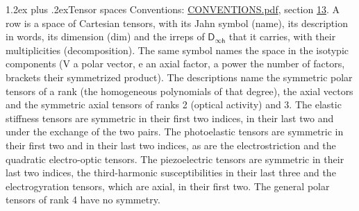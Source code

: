 \documentclass[10pt,a4paper]{article}
\makeatletter
\renewcommand\section{\@startsection{section}{1}{\z@}{-3ex plus -1ex minus -.2ex}%
  {1.2ex plus .2ex}{\normalfont\large\sffamily\bfseries\color{parttitle}}}
\numberwithin{equation}{section}
\newcommand{\grp}[1]{\mathsf{#1}}
\makeatother
\begin{document}
\section{Tensor spaces}\label{s:tensor_spaces}
Conventions: \href{../../CONVENTIONS.pdf}{CONVENTIONS.pdf}, section \href{../../CONVENTIONS.pdf\#conv.13}{13}.
\leavevmode\label{n:head.name}\label{n:head.description}\label{n:head.dim}\label{n:head.decomposition}A row is a space of Cartesian tensors, with its Jahn symbol (name), its description in words, its dimension (dim) and the irreps of $\grp{D_{\infty h}}$ that it carries, with their multiplicities (decomposition). \label{n:label.jahn}The same symbol names the space in the isotypic components (V a polar vector, e an axial factor, a power the number of factors, brackets their symmetrized product). The descriptions name the symmetric polar tensors of a rank (the homogeneous polynomials of that degree), the axial vectors and the symmetric axial tensors of ranks 2 (optical activity) and 3. The elastic stiffness tensors are symmetric in their first two indices, in their last two and under the exchange of the two pairs. The photoelastic tensors are symmetric in their first two and in their last two indices, as are the electrostriction and the quadratic electro-optic tensors. The piezoelectric tensors are symmetric in their last two indices, the third-harmonic susceptibilities in their last three and the electrogyration tensors, which are axial, in their first two. The general polar tensors of rank 4 have no symmetry.
\end{document}
